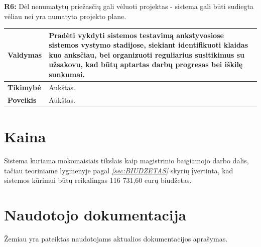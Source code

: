 \documentclass[12pt]{article}
\begin{document}
\noindent \textbf{R6:} Dėl nenumatytų priežasčių gali vėluoti projektas -
sistema gali būti sudiegta vėliau nei yra numatyta projekto plane.
\label{sec:R6}
\begin{table}[htb!]
    \captionsetup{justification=centering}
    \vskip -10pt
    \begin{tabular}{|m{3cm}|m{13.7cm}|}
        \hline
        \raggedleft \textbf{\cellcolor{deepchampagne}Valdymas} &
        Pradėti vykdyti sistemos testavimą ankstyvosiose sistemos vystymo
        stadijose, siekiant identifikuoti klaidas kuo anksčiau, bei organizuoti
        reguliarius susitikimus su užsakovu, kad būtų aptartas darbų progresas
        bei iškilę sunkumai. \\
        \hline
        \raggedleft \textbf{\cellcolor{deepchampagne}Tikimybė} & Aukštas. \\
        \hline
        \raggedleft \textbf{\cellcolor{deepchampagne}Poveikis} & Aukštas. \\
        \hline
    \end{tabular}
\end{table}

\newpage

\section{Kaina}
Sistema kuriama mokomaisiais tikslais kaip magistrinio baigiamojo darbo dalis,
tačiau teoriniame lygmenyje pagal
\textcolor{steelblue}{\emph{\ref{sec:BIUDZETAS} }} skyrių
įvertinta, kad sistemos kūrimui būtų reikalingas 116 731,60 eurų biudžetas.

\section{Naudotojo dokumentacija}
Žemiau yra pateiktas naudotojams aktualios dokumentacijos aprašymas.
\end{document}
